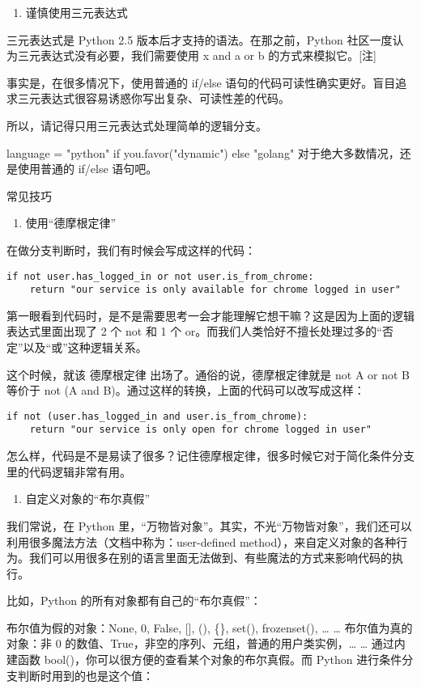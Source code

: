 \documentclass[11pt]{article}
\begin{document}
\begin{enumerate}
\item 谨慎使用三元表达式
\end{enumerate}
三元表达式是 Python 2.5 版本后才支持的语法。在那之前，Python 社区一度认为三元表达式没有必要，我们需要使用 x and a or b 的方式来模拟它。[注]

事实是，在很多情况下，使用普通的 if/else 语句的代码可读性确实更好。盲目追求三元表达式很容易诱惑你写出复杂、可读性差的代码。

所以，请记得只用三元表达式处理简单的逻辑分支。

language = "python" if you.favor("dynamic") else "golang"
对于绝大多数情况，还是使用普通的 if/else 语句吧。

常见技巧
\begin{enumerate}
\item 使用“德摩根定律”
\end{enumerate}
在做分支判断时，我们有时候会写成这样的代码：

\begin{verbatim}
if not user.has_logged_in or not user.is_from_chrome:
    return "our service is only available for chrome logged in user"
\end{verbatim}
第一眼看到代码时，是不是需要思考一会才能理解它想干嘛？这是因为上面的逻辑表达式里面出现了 2 个 not 和 1 个 or。而我们人类恰好不擅长处理过多的“否定”以及“或”这种逻辑关系。

这个时候，就该 德摩根定律 出场了。通俗的说，德摩根定律就是 not A or not B 等价于 not (A and B)。通过这样的转换，上面的代码可以改写成这样：
\begin{verbatim}
if not (user.has_logged_in and user.is_from_chrome):
    return "our service is only open for chrome logged in user"
\end{verbatim}
怎么样，代码是不是易读了很多？记住德摩根定律，很多时候它对于简化条件分支里的代码逻辑非常有用。

\begin{enumerate}
\item 自定义对象的“布尔真假”
\end{enumerate}
我们常说，在 Python 里，“万物皆对象”。其实，不光“万物皆对象”，我们还可以利用很多魔法方法（文档中称为：user-defined method），来自定义对象的各种行为。我们可以用很多在别的语言里面无法做到、有些魔法的方式来影响代码的执行。

比如，Python 的所有对象都有自己的“布尔真假”：

布尔值为假的对象：None, 0, False, [], (), \{\}, set(), frozenset(), \ldots{} \ldots{}
布尔值为真的对象：非 0 的数值、True，非空的序列、元组，普通的用户类实例，\ldots{} \ldots{}
通过内建函数 bool()，你可以很方便的查看某个对象的布尔真假。而 Python 进行条件分支判断时用到的也是这个值：
\end{document}
